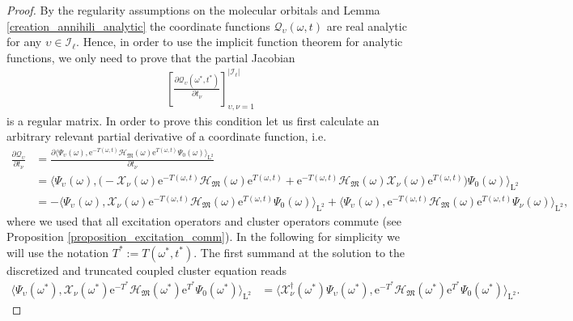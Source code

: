 \documentclass[10pt,a4paper]{amsart}
\begin{document}
\begin{proof}
    By the regularity assumptions on the molecular orbitals and Lemma \ref{creation_annihili_analytic} the  coordinate functions $\mathcal{Q}_\upsilon(\omega,t)$ are real analytic for any $\upsilon\in \mathscr{I}_\ell$. Hence, in order to use the implicit function theorem for analytic functions, we only need to prove that the partial Jacobian 
    \begin{align}\label{jacobian_Q}
        \left[ \frac{\partial \mathcal{Q}_\upsilon (\omega^*,t^*)}{\partial t_\nu}\right]_{\upsilon,\nu=1}^{|\mathscr{I}_\ell|}
    \end{align}
    is a regular matrix. In order to prove this condition let us first calculate an arbitrary relevant partial derivative of a coordinate function, i.e.
    \begin{align*}
        \frac{\partial \mathcal{Q}_\upsilon }{\partial t_\nu}&= \frac{\partial \langle \Psi_\upsilon(\omega),\mathrm{e}^{-T(\omega,t)}\mathcal{H}_\mathfrak{M}(\omega)\mathrm{e}^{T(\omega,t)}\Psi_0(\omega)\rangle_{\mathrm{L}^2} }{\partial t_\nu}\\
        &=\big\langle \Psi_\upsilon(\omega),\big(-\mathscr{X}_\nu(\omega)\mathrm{e}^{-T(\omega,t)}\mathcal{H}_\mathfrak{M}(\omega)\mathrm{e}^{T(\omega,t)}+\mathrm{e}^{-T(\omega,t)}\mathcal{H}_\mathfrak{M}(\omega)\mathscr{X}_\nu(\omega)\mathrm{e}^{T(\omega,t)}\big)\Psi_0(\omega)\big\rangle_{\mathrm{L}^2}\\
        &=-\big\langle \Psi_\upsilon(\omega),\mathscr{X}_\nu(\omega)\mathrm{e}^{-T(\omega,t)}\mathcal{H}_\mathfrak{M}(\omega)\mathrm{e}^{T(\omega,t)}\Psi_0(\omega)\big\rangle_{\mathrm{L}^2}+\big\langle \Psi_\upsilon(\omega),\mathrm{e}^{-T(\omega,t)}\mathcal{H}_\mathfrak{M}(\omega)\mathrm{e}^{T(\omega,t)}\Psi_\nu(\omega)\big\rangle_{\mathrm{L}^2},        \end{align*}
        where we used that all excitation operators and cluster operators commute (see Proposition \ref{proposition_excitation_comm}). In the following for simplicity we will use the notation $T^*:=T(\omega^*,t^*)$. The first summand at the solution to the discretized and truncated coupled cluster equation reads
    \begin{align*}
        \langle \Psi_\upsilon(\omega^*),\mathscr{X}_\nu(\omega^*)\mathrm{e}^{-T^*}\mathcal{H}_\mathfrak{M}(\omega^*)\mathrm{e}^{T^*}\Psi_0(\omega^*)\rangle_{\mathrm{L}^2}&=\langle \mathscr{X}^{\dagger}_\nu(\omega^*)\Psi_\upsilon(\omega^*),\mathrm{e}^{-T^*}\mathcal{H}_\mathfrak{M}(\omega^*)\mathrm{e}^{T^*}\Psi_0(\omega^*)\rangle_{\mathrm{L}^2}.

\end{align*}
\end{proof}
\end{document}
